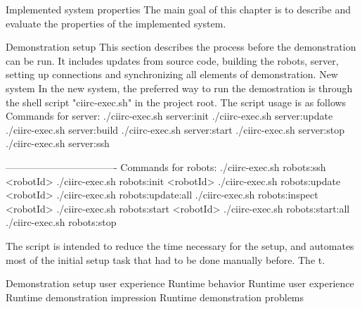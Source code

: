 \chap Implemented system properties
The main goal of this chapter is to describe and evaluate the properties of the implemented system.

\sec Demonstration setup
This section describes the process before the demonstration can be run. It includes updates from source code, building the robots, server, setting up connections and synchronizing all elements of demonstration.
\secc New system
In the new system, the preferred way to run the demostration is through the shell script "ciirc-exec.sh" in the project root. The script usage is as follows
\begtt
Commands for server:
./ciirc-exec.sh server:init
./ciirc-exec.sh server:update
./ciirc-exec.sh server:build
./ciirc-exec.sh server:start
./ciirc-exec.sh server:stop
./ciirc-exec.sh server:ssh

----------------------------------
Commands for robots:
./ciirc-exec.sh robots:ssh <robotId>
./ciirc-exec.sh robots:init <robotId>
./ciirc-exec.sh robots:update <robotId>
./ciirc-exec.sh robots:update:all
./ciirc-exec.sh robots:inspect <robotId>
./ciirc-exec.sh robots:start <robotId>
./ciirc-exec.sh robots:start:all
./ciirc-exec.sh robots:stop
\endtt

The script is intended to reduce the time necessary for the setup, and automates most of the initial setup task that had to be done manually before. The t.

\sec Demonstration setup user experience
\sec Runtime behavior
\sec Runtime user experience
\sec Runtime demonstration impression
\sec Runtime demonstration problems